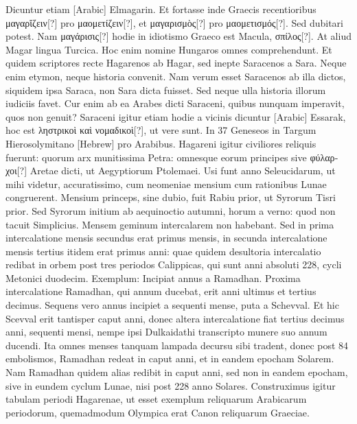 Dicuntur etiam \textarabic{[Arabic]}
Elmagarin.
Et fortasse inde Graecis recentioribus \textgreek{μαγαρἴζειν[?]}
 pro \textgreek{μαομετίζειν[?]},
et \textgreek{μαγαρισμὸς[?]} pro \textgreek{μαομετισμός[?]}.
Sed dubitari potest.
Nam
\textgreek{μαγάρισις[?]} hodie in idiotismo Graeco est Macula,
 \textgreek{σπίλος[?]}.
At aliud
Magar lingua Turcica.
Hoc enim nomine Hungaros omnes comprehendunt.
Et quidem scriptores recte Hagarenos ab Hagar, sed inepte
Saracenos a Sara.
Neque enim etymon, neque historia convenit.
Nam verum esset Saracenos ab illa dictos, siquidem ipsa Saraca, non
Sara dicta fuisset.
Sed neque ulla historia illorum iudiciis favet.
Cur
enim ab ea Arabes dicti Saraceni, quibus nunquam imperavit, quos
non genuit?
Saraceni igitur etiam hodie a vicinis dicuntur \textarabic{[Arabic]}
Essarak, hoc est \textgreek{ληστρικοὶ καὶ νομαδικοὶ[?]}, ut vere sunt.
In 37 Geneseos in
Targum Hierosolymitano \texthebrew{[Hebrew]} pro Arabibus.
Hagareni igitur civiliores
reliquis fuerunt: quorum arx munitissima Petra: omnesque eorum
principes sive \textgreek{φύλαρχοι[?]} Aretae dicti, ut Aegyptiorum Ptolemaei.
Usi
funt anno Seleucidarum, ut mihi videtur, accuratissimo, cum neomeniae
mensium cum rationibus Lunae congruerent.
Mensium princeps,
sine dubio, fuit Rabiu prior, ut Syrorum Tisri prior.
Sed
Syrorum initium ab aequinoctio autumni, horum a verno: quod non tacuit
Simplicius.
Mensem geminum intercalarem non habebant.
Sed in
prima intercalatione mensis secundus erat primus mensis, in secunda
intercalatione mensis tertius itidem erat primus anni: quae quidem
desultoria intercalatio redibat in orbem post tres periodos Calippicas,
qui sunt anni absoluti 228, cycli Metonici duodecim.
Exemplum:
Incipiat annus a Ramadhan.
Proxima intercalatione Ramadhan,
qui annum ducebat, erit anni ultimus et tertius decimus.
Sequens
vero annus incipiet a sequenti mense, puta a Schevval.
Et hic Scevval
erit tantisper caput anni, donec altera intercalatione fiat tertius
decimus anni, sequenti mensi, nempe ipsi Dulkaidathi transcripto
munere suo annum ducendi.
Ita omnes menses tanquam lampada
decursu sibi tradent, donec post 84 embolismos, Ramadhan redeat
in caput anni, et in eandem epocham Solarem.
Nam Ramadhan
quidem alias redibit in caput anni, sed non in eandem epocham, sive
in eundem cyclum Lunae, nisi post 228 anno Solares.
Construximus
igitur tabulam periodi Hagarenae, ut esset exemplum reliquarum
Arabicarum periodorum, quemadmodum Olympica erat Canon reliquarum
Graeciae.

